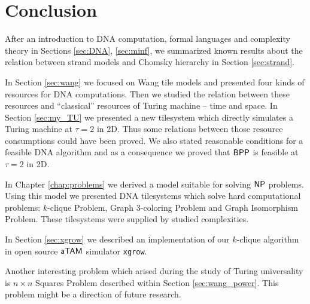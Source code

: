 \cleardoublepage{}   %
\chapter*{Conclusion}

After an introduction to DNA computation, formal languages and complexity theory in Sections \ref{sec:DNA}, \ref{sec:minf}, we summarized known results about the relation between strand models and Chomsky hierarchy in Section \ref{sec:strand}.

In Section \ref{sec:wang} we focused on Wang tile models and presented four kinds of resources for DNA computations. Then we studied the relation between these resources and ``classical'' resources of Turing machine -- time and space. In Section \ref{sec:my_TU} we presented a new tilesystem which directly simulates a Turing machine at $\tau = 2$ in 2D. Thus some relations between those resource consumptions could have been proved. We also stated reasonable conditions for a feasible DNA algorithm and as a consequence we proved that $\mathsf{BPP}$ is feasible at $\tau = 2$ in 2D.

In Chapter \ref{chap:problems} we derived a model suitable for solving $\mathsf{NP}$ problems. Using this model we presented DNA tilesystems which solve hard computational problems: $k$-clique Problem, Graph 3-coloring Problem and Graph Isomorphism Problem. These tilesystems were supplied by studied complexities.

In Section \ref{sec:xgrow} we described an implementation of our $k$-clique algorithm in open source $\mathsf{aTAM}$ simulator {\tt xgrow}.

Another interesting problem which arised during the study of Turing universality is $n\times n$ Squares Problem described within Section \ref{sec:wang_power}. This problem might be a direction of future research.


